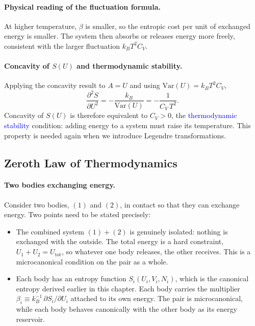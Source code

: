 \paragraph{Physical reading of the fluctuation formula.}
At higher temperature, $\beta$ is smaller, so the entropic cost per unit of
exchanged energy is smaller. The system then absorbs or releases energy more
freely, consistent with the larger fluctuation $k_BT^2C_V$.

\paragraph{Concavity of $S(U)$ and thermodynamic stability.}
Applying the concavity result to $A=U$ and using $\mathrm{Var}(U)=k_BT^2C_V$,
\begin{equation}
    \boxed{\frac{\partial^2 S}{\partial U^2}
    = -\frac{k_B}{\mathrm{Var}(U)} = -\frac{1}{C_V\,T^2}.}
\end{equation}
Concavity of $S(U)$ is therefore equivalent to $C_V>0$, the
\textcolor{blue}{thermodynamic stability} condition: adding energy to a
system must raise its temperature. This property is needed again when we
introduce Legendre transformations.

\subsection{Zeroth Law of Thermodynamics}

\paragraph{Two bodies exchanging energy.}
Consider two bodies, $(1)$ and $(2)$, in contact so that they can exchange
energy. Two points need to be stated precisely:
\begin{itemize}
    \item The combined system $(1)+(2)$ is genuinely isolated: nothing is
    exchanged with the outside. The total energy is a hard constraint,
    $U_1+U_2=U_{\text{tot}}$, so whatever one body releases, the other
    receives. This is a microcanonical condition on the pair as a whole.
    \item Each body has an entropy function $S_i(U_i,V_i,N_i)$, which is the
    canonical entropy derived earlier in this chapter. Each body carries the
    multiplier $\beta_i\equiv k_B^{-1}\,\partial S_i/\partial U_i$ attached to
    its own energy. The pair is microcanonical, while each body behaves
    canonically with the other body as its energy reservoir.
\end{itemize}

